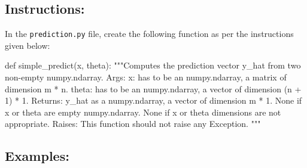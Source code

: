 \documentclass[]{article}
\newenvironment{Shaded}{\begin{snugshade}}{\end{snugshade}}
\newcommand{\CommentTok}[1]{\textcolor[rgb]{0.48,0.49,0.49}{#1}}
\newcommand{\KeywordTok}[1]{\textcolor[rgb]{0.81,0.81,0.76}{#1}}
\newcommand{\NormalTok}[1]{\textcolor[rgb]{0.81,0.81,0.76}{#1}}
\begin{document}
\hypertarget{instructions-1}{%
\subsection{Instructions:}\label{instructions-1}}

In the \texttt{prediction.py} file, create the following function as per
the instructions given below:

\begin{Shaded}
\begin{Highlighting}[]
\KeywordTok{def}\NormalTok{ simple_predict(x, theta):}
    \CommentTok{"""Computes the prediction vector y_hat from two non-empty numpy.ndarray.}
\CommentTok{    Args:}
\CommentTok{      x: has to be an numpy.ndarray, a matrix of dimension m * n.}
\CommentTok{      theta: has to be an numpy.ndarray, a vector of dimension (n + 1) * 1.}
\CommentTok{    Returns:}
\CommentTok{      y_hat as a numpy.ndarray, a vector of dimension m * 1.}
\CommentTok{      None if x or theta are empty numpy.ndarray.}
\CommentTok{      None if x or theta dimensions are not appropriate.}
\CommentTok{    Raises:}
\CommentTok{      This function should not raise any Exception.}
\CommentTok{    """}
\end{Highlighting}
\end{Shaded}

\hypertarget{examples-1}{%
\subsection{Examples:}\label{examples-1}}
\end{document}
